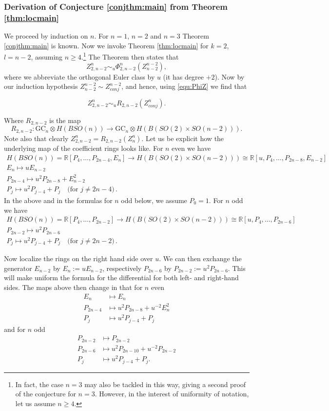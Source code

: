 \documentclass[a4paper]{amsart}
\theoremstyle{plain}
\theoremstyle{definition}
\newcommand{\R}{{\mathbb{R}}}
\newcommand{\GC}{\mathrm{GC}}
\newcommand{\SO}{\mathit{SO}}
\newcommand{\beq}[1]{
\begin{equation}\label{#1}
}
\newcommand{\eeq}{
\end{equation}
}
\begin{document}
\subsubsection{Derivation of Conjecture \ref{conjthm:main} from Theorem \ref{thm:locmain}}
We proceed by induction on $n$. For $n=1$, $n=2$ and $n=3$ Theorem \ref{conjthm:main} is known.
Now we invoke Theorem \ref{thm:locmain} for $k=2$, $l=n-2$, assuming $n\geq 4$.\footnote{In fact, the case $n=3$ may also be tackled in this way, giving a second proof of the conjecture for $n=3$. However, in the interest of uniformity of notation, let us assume $n\geq 4$.}
The Theorem then states that
\[
 Z_{2,n-2}^n \sim_{u} \Phi_{2,n-2}^n (Z_{n-2}^{n-2}),
\] 
where we abbreviate the orthogonal Euler class by $u$ (it has degree $+2$).
Now by our induction hypothesis $Z_{n-2}^{n-2}\sim Z_{conj}^{n-2}$, and hence, using \eqref{equ:PhiZ} we find that
\beq{equ:tmp11}
Z_{2,n-2}^n \sim_{u}  R_{2,n-2}(Z_{conj}^n).
\eeq
Where $R_{2,n-2}$ is the map
\[
R_{2,n-2}\colon\GC_n\otimes H(B\SO(n)) \to \GC_n\otimes H(B(\SO(2)\times \SO(n-2))).
\]
Note also that clearly $Z_{2,n-2}^n=R_{2,n-2}(Z_n^n)$.
Let us be explicit how the underlying map of the coefficient rings looks like.
For $n$ even we have
\begin{gather*}
H(B\SO(n)) = \R[P_4,\dots,P_{2n-4}, E_n] \to H(B(\SO(2)\times \SO(n-2))) \cong \R[u, P_4,\dots,P_{2n-8},E_{n-2}]
\\
E_n \mapsto u E_{n-2} \\
P_{2n-4}\mapsto u^2 P_{2n-8}+ E_{n-2}^2 \\
P_j\mapsto u^2 P_{j-4} + P_j \quad \text{(for $j\neq 2n-4$)}\, .
\end{gather*}
In the above and in the formulas for $n$ odd below, we assume $P_0=1$.
For $n$ odd we have
\begin{gather*}
H(B\SO(n)) = \R[P_4,\dots,P_{2n-2}] \to H(B(\SO(2)\times \SO(n-2))) \cong \R[u, P_4,\dots,P_{2n-6}]
\\
P_{2n-2}\mapsto u^2 P_{2n-6} \\
P_j\mapsto u^2 P_{j-4} + P_j \quad \text{(for $j\neq 2n-2$)} \, .
\end{gather*}

Now localize the rings on the right hand side over $u$. We can then exchange the generator $E_{n-2}$ by $E_n:=uE_{n-2}$, respectively $P_{2n-6}$ by $P_{2n-2} := u^2P_{2n-6}$. This will make uniform the formula
for the differential for both left- and right-hand sides.
The maps above then change in that for $n$ even
\begin{align*}
E_n&\mapsto E_n \\ 
P_{2n-4}&\mapsto u^2 P_{2n-8}+ u^{-2} E_{n}^2 \\
P_j&\mapsto u^2 P_{j-4} + P_j 
\end{align*}
and for $n$ odd
\begin{align*}
P_{2n-2} &\mapsto P_{2n-2} \\  
P_{2n-6}&\mapsto u^2 P_{2n-10}+u^{-2} P_{2n-2} \\
P_j&\mapsto u^2 P_{j-4} + P_j . 
\end{align*}
\end{document}
